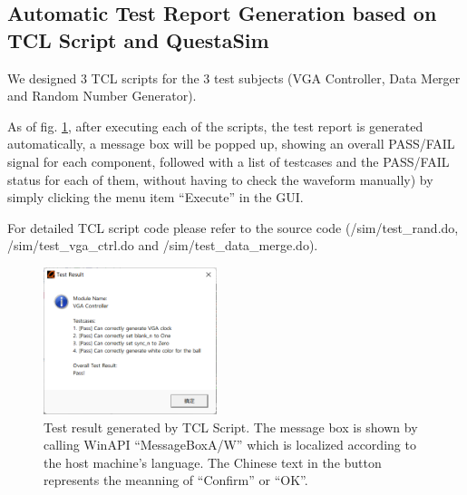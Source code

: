 \documentclass[conference]{IEEEtran}
\begin{document}
\subsection{Automatic Test Report Generation based on TCL Script and QuestaSim}
We designed 3 TCL scripts for the 3 test subjects (VGA Controller, Data Merger and Random Number Generator).

As of fig. \ref{fig_sim1}, after executing each of the scripts, the test report is generated automatically, a message box will be popped up, showing an overall PASS/FAIL signal for each component, followed with a list of testcases and the PASS/FAIL status for each of them, without having to check the waveform manually) by simply clicking the menu item ``Execute'' in the GUI.

For detailed TCL script code please refer to the source code (/sim/test\_rand.do, /sim/test\_vga\_ctrl.do and /sim/test\_data\_merge.do).

\begin{figure}[h] %
    \centering
    \includegraphics[width=0.45\textwidth]{imageset/testresult}
    \caption{Test result generated by TCL Script. The message box is shown by calling WinAPI ``MessageBoxA/W'' which is localized according to the host machine's language. The Chinese text in the button represents the meanning of ``Confirm'' or ``OK''.}
    \label{fig_sim1}
\end{figure}
\end{document}
